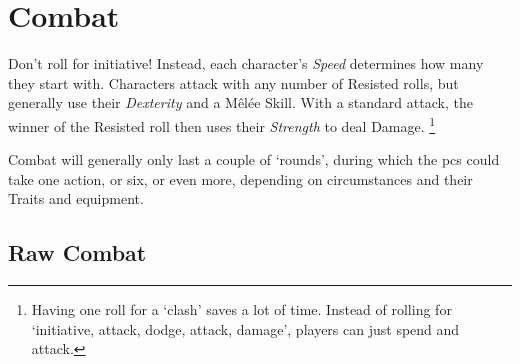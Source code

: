 \chapter[The Arena]{Combat}
\label{combat}

Don't roll for initiative!
Instead, each character's \textit{Speed} determines how many  they start with. 
Characters attack with any number of Resisted rolls, but generally use their \textit{Dexterity} and a M\^{e}l\'ee Skill.
With a standard attack, the winner of the Resisted roll then uses their \textit{Strength} to deal Damage.%
\footnote{Having one roll for a `clash' saves a lot of time.  Instead of rolling for `initiative, attack, dodge, attack, damage', players can just spend  and attack.}

Combat will generally only last a couple of `rounds', during which the \glspl{pc} could take one action, or six, or even more, depending on circumstances and their Traits and equipment.

\section{Raw Combat}

